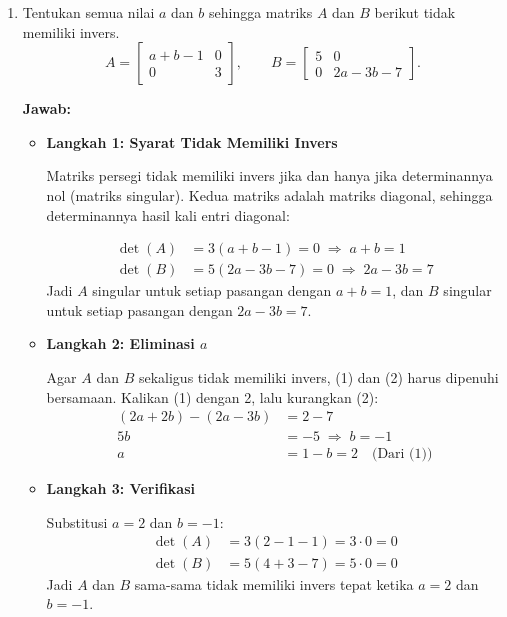 \documentclass[10pt,a4paper]{article}
\newcounter{eqblock}
\newcommand{\reseteq}{%
  \stepcounter{eqblock}%
  \setcounter{equation}{0}%
  \renewcommand{\theHequation}{\arabic{eqblock}.\arabic{equation}}%
}
\begin{document}
\begin{enumerate}
\begin{enumerate}
\end{enumerate}

\item Tentukan semua nilai $a$ dan $b$ sehingga matriks $A$ dan $B$ berikut tidak memiliki invers.
\[
A = \begin{bmatrix} a + b - 1 & 0 \\ 0 & 3 \end{bmatrix}, \qquad
B = \begin{bmatrix} 5 & 0 \\ 0 & 2a - 3b - 7 \end{bmatrix}.
\]

\textbf{Jawab:}
\begin{itemize}
\item \textbf{Langkah 1: Syarat Tidak Memiliki Invers}

Matriks persegi tidak memiliki invers jika dan hanya jika determinannya nol (matriks singular). Kedua matriks adalah matriks diagonal, sehingga determinannya hasil kali entri diagonal:
\reseteq
\begin{align}
\det(A) &= 3(a + b - 1) = 0 \;\Rightarrow\; a + b = 1 \\
\det(B) &= 5(2a - 3b - 7) = 0 \;\Rightarrow\; 2a - 3b = 7
\end{align}
Jadi $A$ singular untuk setiap pasangan dengan $a + b = 1$, dan $B$ singular untuk setiap pasangan dengan $2a - 3b = 7$.

\item \textbf{Langkah 2: Eliminasi $a$}

Agar $A$ dan $B$ sekaligus tidak memiliki invers, (1) dan (2) harus dipenuhi bersamaan. Kalikan (1) dengan 2, lalu kurangkan (2):
\begin{align}
(2a + 2b) - (2a - 3b) &= 2 - 7 \nonumber \\
5b &= -5 \;\Rightarrow\; b = -1 \nonumber \\
a &= 1 - b = 2 \quad \text{(Dari (1))} \nonumber
\end{align}

\item \textbf{Langkah 3: Verifikasi}

Substitusi $a = 2$ dan $b = -1$:
\begin{align}
\det(A) &= 3(2 - 1 - 1) = 3 \cdot 0 = 0 \\
\det(B) &= 5(4 + 3 - 7) = 5 \cdot 0 = 0
\end{align}
Jadi $A$ dan $B$ sama-sama tidak memiliki invers tepat ketika $a = 2$ dan $b = -1$.
\end{itemize}


\end{enumerate}
\end{document}

